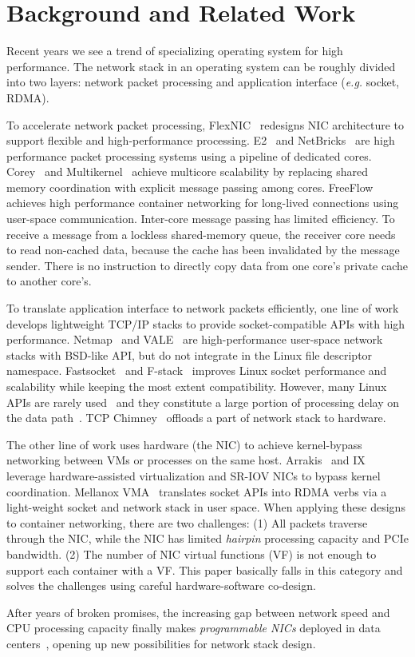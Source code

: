 \section{Background and Related Work}
\label{sec:related}
Recent years we see a trend of specializing operating system for high performance.
The network stack in an operating system can be roughly divided into two layers: network packet processing and application interface (\textit{e.g.} socket, RDMA).

To accelerate network packet processing,
FlexNIC~\cite{kaufmann2015flexnic} redesigns NIC architecture to support flexible and high-performance processing.
E2~\cite{palkar2015e2} and NetBricks~\cite{panda2016netbricks} are high performance packet processing systems using a pipeline of dedicated cores.
Corey~\cite{boyd2008corey} and Multikernel~\cite{baumann2009multikernel} achieve multicore scalability by replacing shared memory coordination with explicit message passing among cores.
FreeFlow~\cite{freeflow} achieves high performance container networking for long-lived connections using user-space communication.
Inter-core message passing has limited efficiency. To receive a message from a lockless shared-memory queue, the receiver core needs to read non-cached data, because the cache has been invalidated by the message sender. There is no instruction to directly copy data from one core's private cache to another core's.

To translate application interface to network packets efficiently, one line of work develops lightweight TCP/IP stacks to provide socket-compatible APIs with high performance.
Netmap~\cite{rizzo2012netmap} and VALE~\cite{rizzo2012vale} are high-performance user-space network stacks with BSD-like API, but do not integrate in the Linux file descriptor namespace.
Fastsocket~\cite{lin2016scalable} and F-stack~\cite{fstack} improves Linux socket performance and scalability while keeping the most extent compatibility.
However, many Linux APIs are rarely used~\cite{tsai2016study} and they constitute a large portion of processing delay on the data path~\cite{peter2016arrakis}.
TCP Chimney~\cite{networking2004network} offloads a part of network stack to hardware.

The other line of work uses hardware (the NIC) to achieve kernel-bypass networking between VMs or processes on the same host.
Arrakis~\cite{peter2016arrakis} and IX~\cite{belay2014ix} leverage hardware-assisted virtualization and SR-IOV NICs to bypass kernel coordination.
Mellanox VMA~\cite{vma} translates socket APIs into RDMA verbs via a light-weight socket and network stack in user space.
When applying these designs to container networking, there are two challenges: (1) All packets traverse through the NIC, while the NIC has limited \textit{hairpin} processing capacity and PCIe bandwidth. (2) The number of NIC virtual functions (VF) is not enough to support each container with a VF.
This paper basically falls in this category and solves the challenges using careful hardware-software co-design.

After years of broken promises, the increasing gap between network speed and CPU processing capacity finally makes \textit{programmable NICs} deployed in data centers~\cite{li2016clicknp}, opening up new possibilities for network stack design.